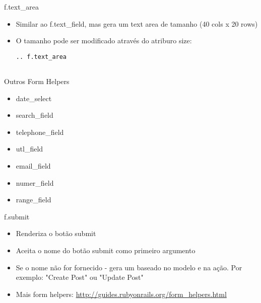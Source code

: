 \begin{frame}{f.text_area}
	\begin{itemize}
		\item Similar ao \alert{f.text_field}, mas gera um text area de tamanho (40 cols x 20 rows) 
		\item O tamanho pode ser modificado através do atriburo size:
		\begin{lstlisting}[style=RubyInputStyle, caption=posts_controller.rb]
			.. f.text_area
			
		\end{lstlisting}	
	\end{itemize}	
\end{frame}
\begin{frame}{Outros Form Helpers}
	\begin{itemize}
		\item date_select 
		\item search_field
		\item telephone_field
		\item utl_field
		\item email_field
		\item numer_field
		\item range_field	
	\end{itemize}	
\end{frame}
\begin{frame}{f.submit}
	\begin{itemize}
		\item Renderiza o botão \alert{submit} 
		\item Aceita o nome do botão submit como primeiro argumento
		\item Se o nome não for fornecido - gera um baseado no modelo e na ação. Por exemplo:
			"Create Post" ou "Update Post" 
		\item Mais form helpers: \url{http://guides.rubyonrails.org/form_helpers.html}	
	\end{itemize}	
\end{frame}